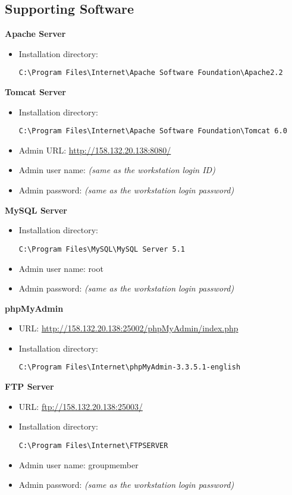 \subsection{Supporting Software}
\textbf{Apache Server}
\begin{itemize}
\item Installation directory: \begin{verbatim}C:\Program Files\Internet\Apache Software Foundation\Apache2.2\end{verbatim}
\end{itemize}
\textbf{Tomcat Server}
\begin{itemize}
\item Installation directory: \begin{verbatim}C:\Program Files\Internet\Apache Software Foundation\Tomcat 6.0\end{verbatim}
\item Admin URL: \url{http://158.132.20.138:8080/}
\item Admin user name: \emph{(same as the workstation login ID)}
\item Admin password: \emph{(same as the workstation login password)}
\end{itemize}
\textbf{MySQL Server}
\begin{itemize}
\item Installation directory: \begin{verbatim}C:\Program Files\MySQL\MySQL Server 5.1\end{verbatim}
\item Admin user name: root
\item Admin password: \emph{(same as the workstation login password)}
\end{itemize}
\textbf{phpMyAdmin}
\begin{itemize}
\item URL: \url{http://158.132.20.138:25002/phpMyAdmin/index.php}
\item Installation directory: \begin{verbatim}C:\Program Files\Internet\phpMyAdmin-3.3.5.1-english\end{verbatim}
\end{itemize}
\textbf{FTP Server}
\begin{itemize}
\item URL: \url{ftp://158.132.20.138:25003/}
\item Installation directory: \begin{verbatim}C:\Program Files\Internet\FTPSERVER\end{verbatim}
\item Admin user name: groupmember
\item Admin password: \emph{(same as the workstation login password)}
\end{itemize}

